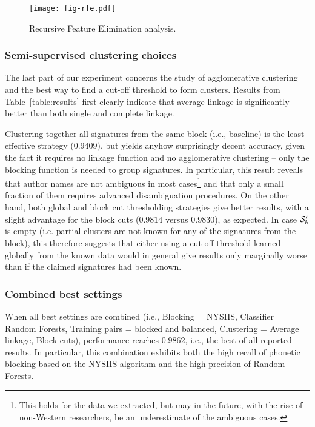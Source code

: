 \documentclass[runningheads,a4paper]{llncs}
\makeatletter
\newcommand*{\ie}{i.e.\@\xspace}
\makeatother
\begin{document}
\begin{figure*}
	\centering
	\caption{Recursive Feature Elimination analysis. }
	\label{fig:rfe}
	\texttt{[image: fig-rfe.pdf]}
\end{figure*}


\subsubsection{Semi-supervised clustering choices}
\label{choices:clustering}
The last part of our experiment concerns
the study of agglomerative clustering and the best way to find a cut-off
threshold to form clusters. Results from Table~\ref{table:results}
first clearly indicate that average linkage is significantly better than
both single and complete linkage.

Clustering together all signatures from the same block (\ie, baseline) is the least effective
strategy ($0.9409$), but yields anyhow surprisingly decent accuracy, given the
fact it requires no linkage function and no agglomerative clustering -- only the blocking
function is needed to group signatures. In particular, this result reveals
that author names are not ambiguous in most cases\footnote{This holds for the
data we extracted, but may in the future, with the rise of non-Western
researchers, be an underestimate of the ambiguous cases.} and that only a small
fraction of them requires advanced disambiguation procedures. On the other
hand, both global and block cut thresholding strategies give better results,
with a slight advantage for the block cuts ($0.9814$ versus $0.9830$), as expected.
In case ${\cal S}^\prime_b$ is empty (\ie partial clusters are not known for any of the signatures from the
block), this therefore suggests that either using
a cut-off threshold learned globally from the known data would in general give results only
marginally worse than if the claimed signatures had been
known.

\subsubsection{Combined best settings} When all best settings are combined (\ie, Blocking = NYSIIS, Classifier = Random Forests, Training
pairs = blocked and balanced, Clustering = Average linkage, Block cuts),
performance reaches $0.9862$, \ie, the best of all reported results. In particular,
this combination exhibits both the high recall of phonetic blocking based on the NYSIIS algorithm and the high precision of Random Forests.
\end{document}
